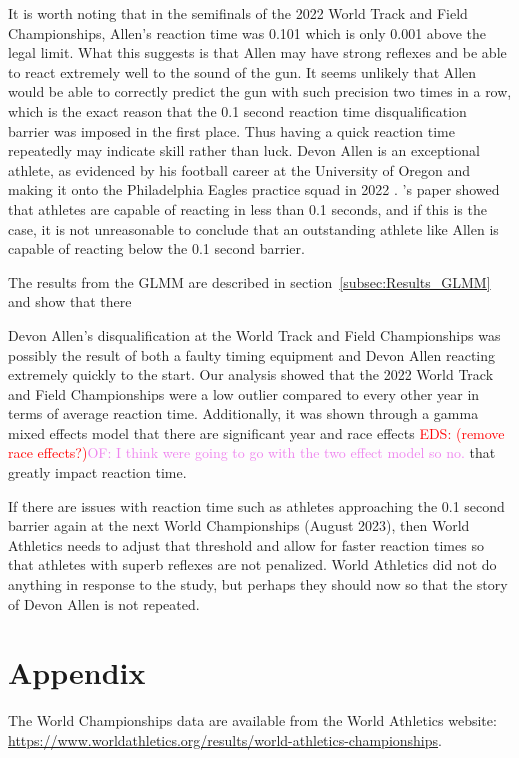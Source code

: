 \documentclass[12pt, letterpaper, titlepage]{article}
\newcommand{\eds}[1]{\textcolor{red}{EDS: (#1)}}
\newcommand{\of}[1]{\textcolor{violet}{OF: #1}}
\begin{document}
It is worth noting that in the semifinals of the 2022 World Track and
Field Championships, Allen's reaction time was 0.101 which is only 0.001 above
the legal limit. What this suggests is that Allen may have strong reflexes
and be able to react extremely well to the sound of the gun. It seems unlikely 
that Allen would be able to correctly predict the gun with such precision two 
times in a row, which is the exact reason that the 0.1 second reaction time 
disqualification barrier was imposed in the first place. Thus having a quick 
reaction time repeatedly may indicate skill rather than luck. Devon Allen is
an exceptional athlete, as evidenced by his football career at the University of
Oregon and making it onto the Philadelphia Eagles practice squad in 2022
\citep{hurley2022eagles}.  \citet{komi2009iaaf}'s paper showed that athletes are
capable of reacting in less than 0.1 seconds, and if this is the case, it is not
unreasonable to conclude that an outstanding athlete like Allen is capable of
reacting below the 0.1 second barrier.

The results from the GLMM are described in section~\ref{subsec:Results_GLMM} and
show that there

Devon Allen's disqualification at the World Track and Field Championships was
possibly the result of both a faulty timing equipment and Devon Allen
reacting extremely quickly to the start.  Our analysis showed that
the 2022 World Track and Field Championships were a low outlier compared to
every other year in terms of average reaction time.  Additionally, it was shown
through a gamma mixed effects model that there are significant year and race
effects \eds{remove race effects?}\of{I think were going to go with the two
effect model so no.} that greatly impact reaction time.  




If there are issues with reaction time such as athletes approaching the 0.1 
second barrier again at the next World Championships (August 2023), then World 
Athletics needs to adjust that threshold and allow for faster reaction times so 
that athletes with superb reflexes are not penalized.  World Athletics did not
do anything in response to the \citet{komi2009iaaf} study, but perhaps they 
should now so that the story of Devon Allen is not repeated.

\section*{Appendix}
\label{sec:Appendix}
The World Championships data are available from the World Athletics website:
\url{https://www.worldathletics.org/results/world-athletics-championships}.
\end{document}
